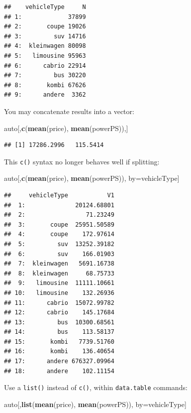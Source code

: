 \documentclass[]{book}
\newenvironment{Shaded}{\begin{snugshade}}{\end{snugshade}}
\newcommand{\KeywordTok}[1]{\textcolor[rgb]{0.13,0.29,0.53}{\textbf{#1}}}
\newcommand{\NormalTok}[1]{#1}
\theoremstyle{definition}
\theoremstyle{definition}
\theoremstyle{definition}
\theoremstyle{remark}
\begin{document}
\begin{verbatim}
##    vehicleType     N
## 1:             37899
## 2:       coupe 19026
## 3:         suv 14716
## 4:  kleinwagen 80098
## 5:   limousine 95963
## 6:      cabrio 22914
## 7:         bus 30220
## 8:       kombi 67626
## 9:      andere  3362
\end{verbatim}

You may concatenate results into a vector:

\begin{Shaded}
\begin{Highlighting}[]
\NormalTok{auto[,}\KeywordTok{c}\NormalTok{(}\KeywordTok{mean}\NormalTok{(price), }\KeywordTok{mean}\NormalTok{(powerPS)),]}
\end{Highlighting}
\end{Shaded}

\begin{verbatim}
## [1] 17286.2996   115.5414
\end{verbatim}

This \texttt{c()} syntax no longer behaves well if splitting:

\begin{Shaded}
\begin{Highlighting}[]
\NormalTok{auto[,}\KeywordTok{c}\NormalTok{(}\KeywordTok{mean}\NormalTok{(price), }\KeywordTok{mean}\NormalTok{(powerPS)), by=vehicleType]}
\end{Highlighting}
\end{Shaded}

\begin{verbatim}
##     vehicleType           V1
##  1:              20124.68801
##  2:                 71.23249
##  3:       coupe  25951.50589
##  4:       coupe    172.97614
##  5:         suv  13252.39182
##  6:         suv    166.01903
##  7:  kleinwagen   5691.16738
##  8:  kleinwagen     68.75733
##  9:   limousine  11111.10661
## 10:   limousine    132.26936
## 11:      cabrio  15072.99782
## 12:      cabrio    145.17684
## 13:         bus  10300.68561
## 14:         bus    113.58137
## 15:       kombi   7739.51760
## 16:       kombi    136.40654
## 17:      andere 676327.09964
## 18:      andere    102.11154
\end{verbatim}

Use a \texttt{list()} instead of \texttt{c()}, within
\texttt{data.table} commands:

\begin{Shaded}
\begin{Highlighting}[]
\NormalTok{auto[,}\KeywordTok{list}\NormalTok{(}\KeywordTok{mean}\NormalTok{(price), }\KeywordTok{mean}\NormalTok{(powerPS)), by=vehicleType]}
\end{Highlighting}
\end{Shaded}
\end{document}
